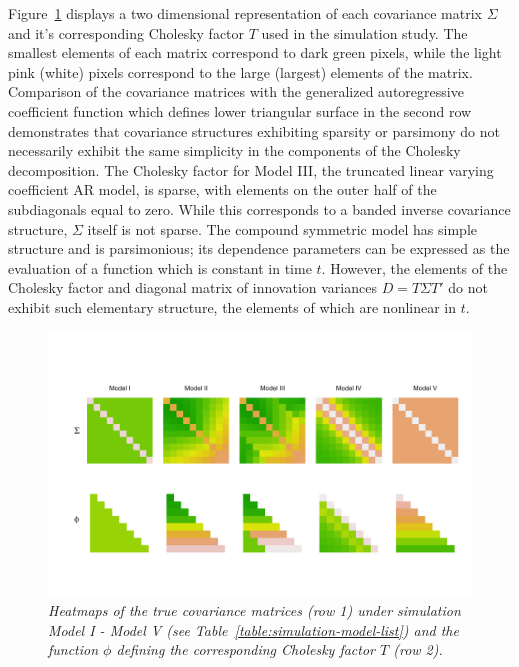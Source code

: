 \bigskip

Figure~\ref{fig:true-covariance-heatmaps} displays a two dimensional representation of each covariance matrix $\Sigma$ and it's corresponding Cholesky factor $T$ used in the simulation study. The smallest elements of each matrix correspond to dark green pixels, while the light pink (white) pixels correspond to the large (largest) elements of the matrix. Comparison of the covariance matrices with the generalized autoregressive coefficient function which defines lower triangular surface in the second row demonstrates that covariance structures exhibiting sparsity or parsimony do not necessarily exhibit the same simplicity in the components of the Cholesky decomposition. The Cholesky factor for Model III, the truncated linear varying coefficient AR model, is sparse, with elements on the outer half of the subdiagonals equal to zero. While this corresponds to a banded inverse covariance structure, $\Sigma$ itself is not sparse.  The compound symmetric model has simple structure and is parsimonious; its dependence parameters can be expressed as the evaluation of a function which is constant in time $t$. However, the elements of the Cholesky factor and diagonal matrix of innovation variances $D = T \Sigma T'$ do not exhibit such elementary structure, the elements of which are nonlinear in $t$. 

%
\begin{figure}[H] 
\begin{center}
  \includegraphics[width = \textwidth]{img/chapter-4/cov-cholesky-grid}%
\caption{\textit{Heatmaps of the true covariance matrices (row 1) under simulation Model I - Model V (see Table~\ref{table:simulation-model-list}) and the function $\phi$ defining the corresponding Cholesky factor $T$ (row 2).} } \label{fig:true-covariance-heatmaps}
\end{center}
\end{figure}


